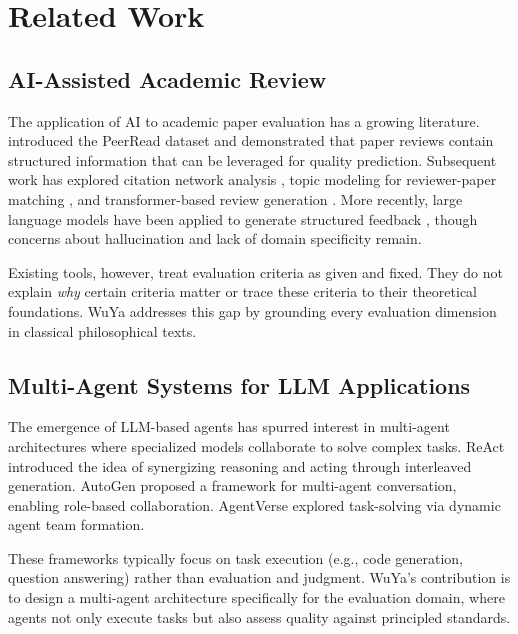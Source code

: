 \section{Related Work}
\label{sec:related}

\subsection{AI-Assisted Academic Review}

The application of AI to academic paper evaluation has a growing literature. \citet{kang2018peerread} introduced the PeerRead dataset and demonstrated that paper reviews contain structured information that can be leveraged for quality prediction. Subsequent work has explored citation network analysis \citep{bornmann2008scientific}, topic modeling for reviewer-paper matching \citep{stevinson2019finding}, and transformer-based review generation \citep{tran2023automatic}. More recently, large language models have been applied to generate structured feedback \citep{liu2024can}, though concerns about hallucination and lack of domain specificity remain.

Existing tools, however, treat evaluation criteria as given and fixed. They do not explain \textit{why} certain criteria matter or trace these criteria to their theoretical foundations. WuYa addresses this gap by grounding every evaluation dimension in classical philosophical texts.

\subsection{Multi-Agent Systems for LLM Applications}

The emergence of LLM-based agents has spurred interest in multi-agent architectures where specialized models collaborate to solve complex tasks. ReAct \citep{yao2023react} introduced the idea of synergizing reasoning and acting through interleaved generation. AutoGen \citep{wu2023autogen} proposed a framework for multi-agent conversation, enabling role-based collaboration. AgentVerse \citep{chen2023agentverse} explored task-solving via dynamic agent team formation.

These frameworks typically focus on task execution (e.g., code generation, question answering) rather than evaluation and judgment. WuYa's contribution is to design a multi-agent architecture specifically for the evaluation domain, where agents not only execute tasks but also assess quality against principled standards.

